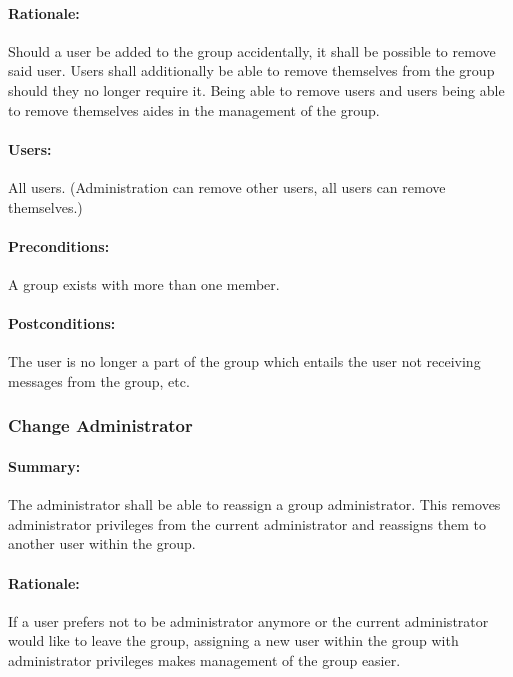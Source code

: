 \documentclass[11pt]{article}
\begin{document}
\paragraph{Rationale:}
Should a user be added to the group accidentally, it shall be possible to remove said user. Users shall additionally be able to remove themselves from the group should they no longer require it. Being able to remove users and users being able to remove themselves aides in the management of the group.
\paragraph{Users:}
All users. (Administration can remove other users, all users can remove themselves.)
\paragraph{Preconditions:}
A group exists with more than one member.
\paragraph{{Postconditions:}}
The user is no longer a part of the group which entails the user not receiving messages from the group, etc.

\subsubsection{Change Administrator} \label{UC-change-admin}
\paragraph{Summary:}
The administrator shall be able to reassign a group administrator. This removes administrator privileges from the current administrator and reassigns them to another user within the group.
\paragraph{Rationale:}
If a user prefers not to be administrator anymore or the current administrator would like to leave the group, assigning a new user within the group with administrator privileges makes management of the group easier.
\end{document}
